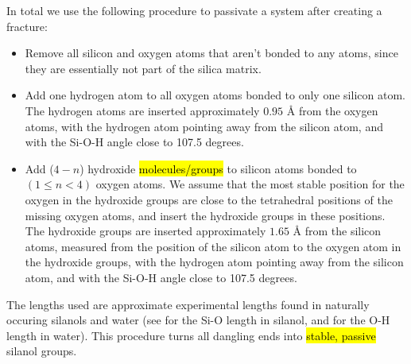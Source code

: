 In total we use the following procedure to passivate a system after creating a fracture:
\begin{itemize}
    \item Remove all silicon and oxygen atoms that aren't bonded to any atoms, since they are essentially not part of the silica matrix.
    \item Add one hydrogen atom to all oxygen atoms bonded to only one silicon atom. The hydrogen atoms are inserted approximately $0.95\text{ \AA}$ from the oxygen atoms, with the hydrogen atom pointing away from the silicon atom, and with the Si-O-H angle close to 107.5 degrees.
    \item Add ($4-n$) hydroxide \hl{molecules/groups} to silicon atoms bonded to $(1\leq n<4)$ oxygen atoms. We assume that the most stable position for the oxygen in the hydroxide groups are close to the tetrahedral positions of the missing oxygen atoms, and insert the hydroxide groups in these positions. %
    The hydroxide groups are inserted approximately $1.65\text{ \AA}$ from the silicon atoms, measured from the position of the silicon atom to the oxygen atom in the hydroxide groups, with the hydrogen atom pointing away from the silicon atom, and with the Si-O-H angle close to 107.5 degrees.
\end{itemize}
The lengths used are approximate experimental lengths found in naturally occuring silanols and water (see \cite{lickiss1995synthesis} for the Si-O length in silanol, and \cite{csaszar2005equilibrium} for the O-H length in water). This procedure turns all dangling ends into \hl{stable, passive} silanol groups.
%
